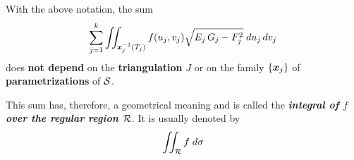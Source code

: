 \documentclass[11pt]{article}
\begin{document}
\begin{itemize}
\begin{proposition}\label{prop: area_integral}
With the above notation, the sum 
\begin{align*}
\sum_{j=1}^{k}\iint_{\boldsymbol{x}_{j}^{-1}(T_{j})}f(u_j, v_j)\sqrt{E_j\,G_j - F_j^2}\; du_j\,dv_j
\end{align*}
does \textbf{not depend} on the \textbf{triangulation} $J$ or on the family $\left\{\boldsymbol{x}_{j}\right\}$ of \textbf{parametrizations} of ${\mathcal S}$.
\end{proposition}

This sum has, therefore, a geometrical meaning and is called the \emph{\textbf{integral of $f$ over the regular region ${\mathcal R}$}}. It is usually denoted by
\begin{align*}
\iint_{{\mathcal R}} f\;d\sigma
\end{align*}
\end{itemize}
\end{document}
